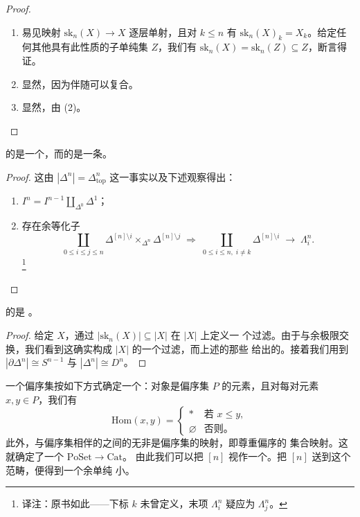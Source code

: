 \begin{proof}
\begin{enumerate}[label=(\arabic*)]
  \item 易见映射 $\mathrm{sk}_n(X) \to X$ 逐层单射，且对 $k \le n$ 有
  $\mathrm{sk}_n(X)_k = X_k$。给定任何其他具有此性质的子单纯集 $Z$，我们有
  $\mathrm{sk}_n(X) = \mathrm{sk}_n(Z) \subseteq Z$，断言得证。
  \item 显然，因为伴随可以复合。
  \item 显然，由 (2)。
\end{enumerate}
\end{proof}

\begin{lemma}\label{lem:realization-horn-spine}
\trHorn{}的\trGeometricRealization{}是一个\trHorn{}，而\trSpine{}的\trGeometricRealization{}是一条\trSpine{}。
\end{lemma}
\begin{proof}
这由 $|\Delta^n| = \Delta^n_{\mathrm{top}}$ 这一事实以及下述观察得出：
\begin{enumerate}[label=(\arabic*)]
  \item $I^n = I^{n-1} \coprod_{\Delta^0} \Delta^1$；
  \item 存在余等化子
\[
\coprod_{0 \le i \le j \le n} \Delta^{[n]\setminus i} \times_{\Delta^n}
\Delta^{[n]\setminus j}
\;\Longrightarrow\;
\coprod_{0 \le i \le n,\; i \neq k} \Delta^{[n]\setminus i}
\;\longrightarrow\;
\Lambda^n_i.
\]
\footnote{译注：原书如此——下标 $k$ 未曾定义，末项 $\Lambda^n_i$ 疑应为 $\Lambda^n_j$。}
\end{enumerate}
\end{proof}

\begin{corollary}\label{cor:realization-cw-complex}
\trSimplicialSet{}的\trGeometricRealization{}是 \trCWComplex{}。
\end{corollary}

\begin{proof}
给定\trSimplicialSet{} $X$，通过 $|\mathrm{sk}_n(X)| \subseteq |X|$ 在 $|X|$ 上定义一
个过滤。由于\trGeometricRealization{}与余极限交换，我们看到这确实构成 $|X|$ 的一个过滤，而上述的那些%
\trPushout{}给出\trGeometricRealization{}的\trPushout{}。接着我们用到 $|\partial\Delta^n| \cong S^{n-1}$ 与
$|\Delta^n| \cong D^n$。
\end{proof}

\begin{observation}\label{obs:poset-to-category}
一个偏序集按如下方式确定一个\trCategory{}：对象是偏序集 $P$ 的元素，且对每对元素
$x, y \in P$，我们有
\[
\mathrm{Hom}(x, y) =
\begin{cases}
* & \text{若 } x \le y, \\
\varnothing & \text{否则。}
\end{cases}
\]
此外，与偏序集相伴的\trCategory{}之间的\trFunctor{}无非是偏序集的映射，即尊重偏序的
集合映射。这就确定了一个\trFullyFaithful{}\trFunctor{} $\mathrm{PoSet} \to \mathrm{Cat}$。
由此我们可以把 $[n]$ 视作一个\trCategory{}。把 $[n]$ 送到这个范畴，便得到一个余单纯
小\trCategory{}。
\end{observation}

